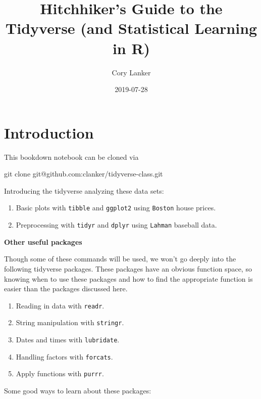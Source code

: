 \documentclass[]{book}
\title{Hitchhiker's Guide to the Tidyverse (and Statistical Learning in R)}
\author{Cory Lanker}
\date{2019-07-28}
\newenvironment{Shaded}{\begin{snugshade}}{\end{snugshade}}
\newcommand{\FunctionTok}[1]{\textcolor[rgb]{0.00,0.00,0.00}{#1}}
\newcommand{\NormalTok}[1]{#1}
\providecommand{\tightlist}{%
  \setlength{\itemsep}{0pt}\setlength{\parskip}{0pt}}
\begin{document}
\maketitle

{
\setcounter{tocdepth}{1}
\tableofcontents
}
\chapter*{Introduction}\label{introduction}

This bookdown notebook can be cloned via

\begin{Shaded}
\begin{Highlighting}[]
\FunctionTok{git}\NormalTok{ clone git@github.com:clanker/tidyverse-class.git}
\end{Highlighting}
\end{Shaded}

Introducing the tidyverse analyzing these data sets:

\begin{enumerate}
\def\labelenumi{\arabic{enumi}.}
\tightlist
\item
  Basic plots with \texttt{tibble} and \texttt{ggplot2} using
  \texttt{Boston} house prices.
\item
  Preprocessing with \texttt{tidyr} and \texttt{dplyr} using
  \texttt{Lahman} baseball data.
\end{enumerate}

\textbf{Other useful packages}

Though some of these commands will be used, we won't go deeply into the
following tidyverse packages. These packages have an obvious function
space, so knowing when to use these packages and how to find the
appropriate function is easier than the packages discussed here.

\begin{enumerate}
\def\labelenumi{\arabic{enumi}.}
\tightlist
\item
  Reading in data with \texttt{readr}.
\item
  String manipulation with \texttt{stringr}.
\item
  Dates and times with \texttt{lubridate}.
\item
  Handling factors with \texttt{forcats}.
\item
  Apply functions with \texttt{purrr}.
\end{enumerate}

Some good ways to learn about these packages:
\end{document}
